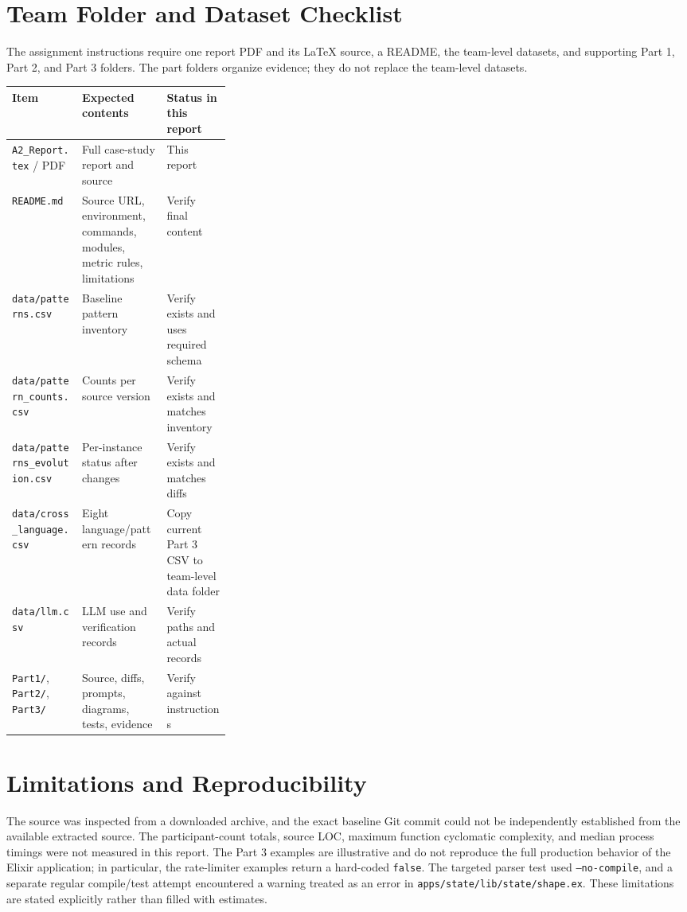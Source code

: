 \documentclass[11pt,a4paper]{article}
\newcommand{\code}[1]{\texttt{#1}}
\begin{document}
\section{Team Folder and Dataset Checklist}
The assignment instructions require one report PDF and its LaTeX source, a README, the team-level datasets, and supporting Part 1, Part 2, and Part 3 folders. The part folders organize evidence; they do not replace the team-level datasets.

\begin{center}
\begin{tabularx}{\linewidth}{@{}p{0.32\linewidth}Xl@{}}
\toprule Item & Expected contents & Status in this report\\ \midrule
\code{A2\_Report.tex} / PDF & Full case-study report and source & This report\\
\code{README.md} & Source URL, environment, commands, modules, metric rules, limitations & Verify final content\\
\code{data/patterns.csv} & Baseline pattern inventory & Verify exists and uses required schema\\
\code{data/pattern\_counts.csv} & Counts per source version & Verify exists and matches inventory\\
\code{data/patterns\_evolution.csv} & Per-instance status after changes & Verify exists and matches diffs\\
\code{data/cross\_language.csv} & Eight language/pattern records & Copy current Part 3 CSV to team-level data folder\\
\code{data/llm.csv} & LLM use and verification records & Verify paths and actual records\\
\code{Part1/}, \code{Part2/}, \code{Part3/} & Source, diffs, prompts, diagrams, tests, evidence & Verify against instructions\\
\bottomrule
\end{tabularx}
\end{center}


\section{Limitations and Reproducibility}
The source was inspected from a downloaded archive, and the exact baseline Git commit could not be independently established from the available extracted source. The participant-count totals, source LOC, maximum function cyclomatic complexity, and median process timings were not measured in this report. The Part 3 examples are illustrative and do not reproduce the full production behavior of the Elixir application; in particular, the rate-limiter examples return a hard-coded \code{false}. The targeted parser test used \code{--no-compile}, and a separate regular compile/test attempt encountered a warning treated as an error in \code{apps/state/lib/state/shape.ex}. These limitations are stated explicitly rather than filled with estimates.
\end{document}
